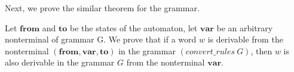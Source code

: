 %
%


Next, we prove the similar theorem for the grammar.

\begin{theorem}
	Let $ \boldsymbol{from} $ and $ \boldsymbol{to} $ be the states of the automaton, let $ \boldsymbol{var} $ be an arbitrary nonterminal of grammar G. We prove that if a word $w$ is derivable from the nonterminal $ (\boldsymbol{from}, \boldsymbol{var}, \boldsymbol{to}) $ in the grammar $ (convert\_rules ~ G)$, then $w$ is also derivable in the grammar $G$ from the nonterminal $ \boldsymbol{var} $.
\end{theorem}

